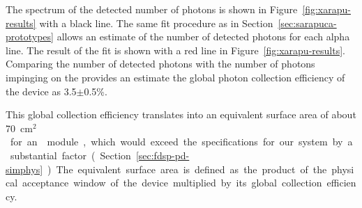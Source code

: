 
The spectrum of the detected number of photons is shown in Figure~\ref{fig:xarapu-results} with a black line. The same fit procedure as in Section~\ref{sec:sarapuca-prototypes} allows an estimate of the number of detected photons for each alpha line. The result of the fit is shown with a red line in Figure~\ref{fig:xarapu-results}. Comparing the number of detected photons with the number of photons impinging on the  provides an estimate the global photon collection efficiency of the device as 3.5$\pm$0.5\%.


This global collection efficiency translates into an equivalent surface area of about \SI{70}{cm$^2$} for an  module, which would exceed the  specifications for our system by a substantial factor (Section~\ref{sec:fdsp-pd-simphys}). The equivalent surface area is defined as the product of the physical acceptance window of the device multiplied by its global collection efficiency.

